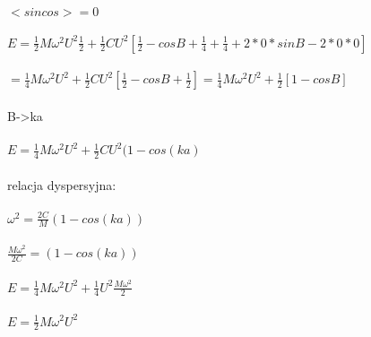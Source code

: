 $<sin cos>=0$
\\
\\
$E=\frac{1}{2}M\omega^2U^2\frac{1}{2}+\frac{1}{2}CU^2[\frac{1}{2}-cosB+\frac{1}{4}+\frac{1}{4}+2*0*sinB-2*0*0]$
\\
\\
$=\frac{1}{4}M\omega^2U^2+\frac{1}{2}CU^2[\frac{1}{2}-cosB+\frac{1}{2}]=\frac{1}{4}M\omega^2U^2+\frac{1}{2}[1-cosB]$
\\
\\
B->ka
\\
\\
$E=\frac{1}{4}M\omega^2U^2+\frac{1}{2}CU^2(1-cos(ka)$
\\
\\
relacja dyspersyjna:
\\
\\
$\omega^2=\frac{2C}{M}(1-cos(ka))$
\\
\\
$\frac{M\omega^2}{2C}=(1-cos(ka))$
\\
\\
$E=\frac{1}{4}M\omega^2U^2+\frac{1}{4}U^2\frac{M\omega^2}{2}$
\\
\\
$E=\frac{1}{2}M\omega^2U^2$